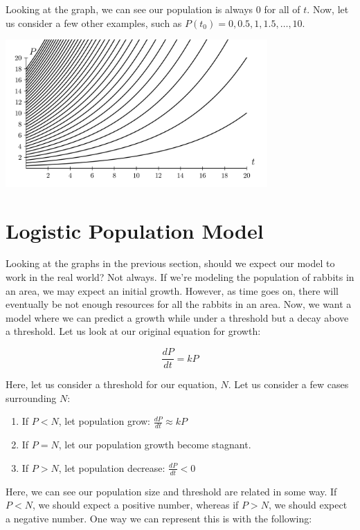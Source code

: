 \documentclass{amsart}
\theoremstyle{definition}
\numberwithin{equation}{section}
\begin{document}
\begin{sansmath}
Looking at the graph, we can see our population is always $0$ for all of $t$. Now, let us consider a few other examples, such as $P(t_0) = 0, 0.5, 1, 1.5, \ldots, 10$.

\begin{center}
  \includegraphics[width=10cm]{ExponentialGrowGroup}
\end{center}

\section{Logistic Population Model}

Looking at the graphs in the previous section, should we expect our model to work in the real world? Not always. If we're modeling the population of rabbits in an area, we may expect an initial growth. However, as time goes on, there will eventually be not enough resources for all the rabbits in an area. Now, we want a model where we can predict a growth while under a threshold but a decay above a threshold. Let us look at our original equation for growth:

\[ \frac{dP}{dt} = kP \]

Here, let us consider a threshold for our equation, $N$. Let us consider a few cases surrounding $N$:

\begin{enumerate}
  \item If $P < N$, let population grow: $\frac{dP}{dt} \approx kP$
  \item If $P = N$, let our population growth become stagnant.
  \item If $P > N$, let population decrease: $\frac{dP}{dt} < 0$
\end{enumerate}

Here, we can see our population size and threshold are related in some way. If $P < N$, we should expect a positive number, whereas if $P > N$, we should expect a negative number. One way we can represent this is with the following:


\end{sansmath}
\end{document}
